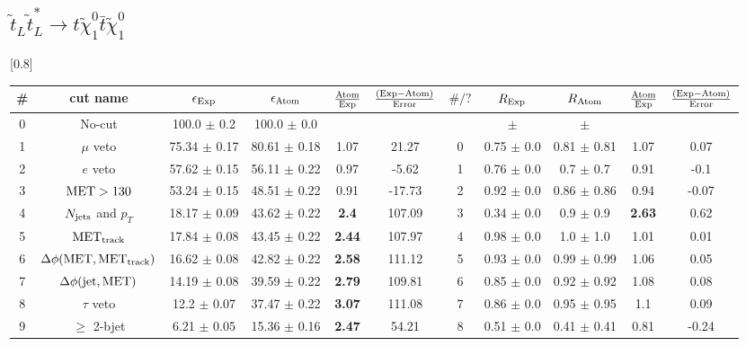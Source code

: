 \documentclass[12pt]{article}
\begin{document}
\subsection*{ $\tilde t_L \tilde t_L^{*} \to t \tilde \chi_1^0 \bar t \tilde \chi_1^0$ }




\renewcommand{\arraystretch}{1.3}
\begin{table}[h!]
\begin{center}
\scalebox{0.7}[0.8]{ 
\begin{tabular}{c|c||c|c|>{\columncolor{yellow}}c|c||c|c|c|>{\columncolor{yellow}}c|c}
\hline
\# & cut name & $\epsilon_{\rm Exp}$ & $\epsilon_{\rm Atom}$ & $\frac{\rm Atom}{\rm Exp}$ & $\frac{({\rm Exp} - {\rm Atom})}{\rm Error}$ & $\#/?$ & $R_{\rm Exp}$ & $R_{\rm Atom}$ & $\frac{\rm Atom}{\rm Exp}$ & $\frac{({\rm Exp} - {\rm Atom})}{\rm Error}$ \\
\hline
0 & No-cut & 100.0 $\pm$ 0.2 & 100.0 $\pm$ 0.0 &  &  &  &  $\pm$  &  $\pm$  &  &  \\
1 & $\mu$ veto & 75.34 $\pm$ 0.17 & 80.61 $\pm$ 0.18 & 1.07 & 21.27 & 0 & 0.75 $\pm$ 0.0 & 0.81 $\pm$ 0.81 & 1.07 & 0.07 \\
2 & $e$ veto & 57.62 $\pm$ 0.15 & 56.11 $\pm$ 0.22 & 0.97 & -5.62 & 1 & 0.76 $\pm$ 0.0 & 0.7 $\pm$ 0.7 & 0.91 & -0.1 \\
3 & ${\rm MET} > 130$ & 53.24 $\pm$ 0.15 & 48.51 $\pm$ 0.22 & 0.91 & -17.73 & 2 & 0.92 $\pm$ 0.0 & 0.86 $\pm$ 0.86 & 0.94 & -0.07 \\
4 & \cellcolor{cyan} $N_{\rm jets}$ and $p_T$ & 18.17 $\pm$ 0.09 & 43.62 $\pm$ 0.22 & \color{red}\bf 2.4 & 107.09 & 3 & 0.34 $\pm$ 0.0 & 0.9 $\pm$ 0.9 & \color{blue}\bf 2.63 & 0.62 \\
5 & ${\rm MET}_{\rm track}$ & 17.84 $\pm$ 0.08 & 43.45 $\pm$ 0.22 & \color{red}\bf 2.44 & 107.97 & 4 & 0.98 $\pm$ 0.0 & 1.0 $\pm$ 1.0 & 1.01 & 0.01 \\
6 & $\Delta \phi (\rm MET, MET_{track}) $ & 16.62 $\pm$ 0.08 & 42.82 $\pm$ 0.22 & \color{red}\bf 2.58 & 111.12 & 5 & 0.93 $\pm$ 0.0 & 0.99 $\pm$ 0.99 & 1.06 & 0.05 \\
7 & $\Delta \phi (\rm jet, MET) $ & 14.19 $\pm$ 0.08 & 39.59 $\pm$ 0.22 & \color{red}\bf 2.79 & 109.81 & 6 & 0.85 $\pm$ 0.0 & 0.92 $\pm$ 0.92 & 1.08 & 0.08 \\
8 & $\tau$ veto & 12.2 $\pm$ 0.07 & 37.47 $\pm$ 0.22 & \color{red}\bf 3.07 & 111.08 & 7 & 0.86 $\pm$ 0.0 & 0.95 $\pm$ 0.95 & 1.1 & 0.09 \\
9 & $\ge$ 2-bjet & 6.21 $\pm$ 0.05 & 15.36 $\pm$ 0.16 & \color{red}\bf 2.47 & 54.21 & 8 & 0.51 $\pm$ 0.0 & 0.41 $\pm$ 0.41 & 0.81 & -0.24 \\

\end{tabular}}
\end{center}
\end{table}
\end{document}
